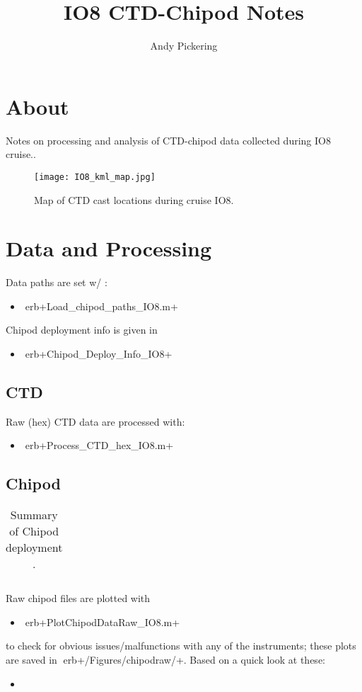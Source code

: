 \documentclass[11pt]{article}
\title{IO8 CTD-Chipod Notes}
\author{Andy Pickering}
\begin{document}
 
\maketitle 
\tableofcontents 
\newpage 

 \section{About} 

Notes on processing and analysis of CTD-chipod data collected during IO8 cruise.. 

\begin{figure}[htbp] 
\texttt{[image: IO8\_kml\_map.jpg]} 
\caption{Map of CTD cast locations during cruise IO8.} 
\label{map} 
\end{figure} 



\section{Data and Processing} 

Data paths are set w/ :  
\begin{itemize} 
\item erb+Load_chipod_paths_IO8.m+ 
\end{itemize} 

Chipod deployment info is given in  
\begin{itemize} 
\item erb+Chipod_Deploy_Info_IO8+ 
\end{itemize} 

\subsection{CTD} 

Raw (hex) CTD data are processed with: 
\begin{itemize} 
\item erb+Process_CTD_hex_IO8.m+ 
\end{itemize} 

\subsection{Chipod} 

\begin{table}[htdp] 
\caption{Summary of Chipod deployment .} 
\begin{center} 
\begin{tabular}{|c|c|c|c|} 
\hline 
\end{tabular} 
\end{center} 
\label{default} 
\end{table}Raw chipod files are plotted with  
\begin{itemize} 
\item erb+PlotChipodDataRaw_IO8.m+ 
\end{itemize} 
to check for obvious issues/malfunctions with any of the instruments; these plots are saved in erb+/Figures/chipodraw/+.  
Based on a quick look at these: 
\begin{itemize} 
\item 
\end{itemize} 
\end{document}
